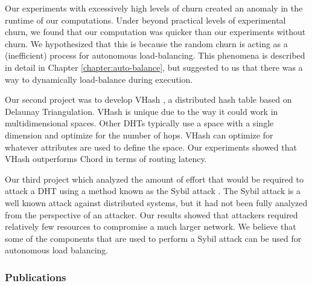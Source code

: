 Our experiments with excessively high levels of churn created an anomaly in the runtime of our computations.
Under beyond practical levels of experimental churn, we found that our computation was quicker than our experiments without churn.
We hypothesized that this is because the random churn is acting as a (inefficient) process for autonomous load-balancing.
This phenomena is described in detail in Chapter \ref{chapter:auto-balance}, but suggested to us that there was a way to  dynamically load-balance during execution.

Our second project was to develop VHash \cite{dgvh} \cite{vhash}, a distributed hash table based on Delaunay Triangulation.
VHash is unique due to the way it could work in multidimensional spaces.
Other DHTs typically use a space with a single dimension and optimize for the number of hops.
VHash can optimize for whatever attributes are used to define the space. 
Our experiments showed that VHash outperforms Chord in terms of routing latency.



Our third project which analyzed the amount of effort that would be required to attack a DHT using a method known as the Sybil attack \cite{sybil-analysis}.
The Sybil attack \cite{sybil} is a well known attack against distributed systems, but it had not been fully analyzed from the perspective of an attacker.
Our results showed that attackers required relatively few resources to compromise a much larger network.
We believe that some of the components that are used to perform a Sybil attack can be used for autonomous load balancing.



\subsubsection{Publications}

